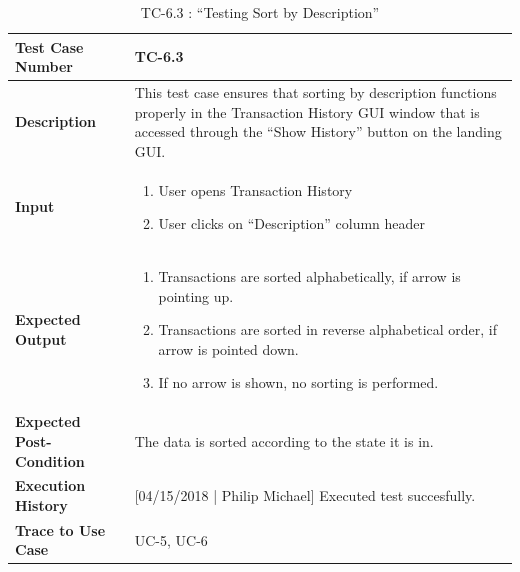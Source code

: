 \documentclass[12pt]{article}
\begin{document}
\begin{table}[H]
\caption{TC-6.3 : “Testing Sort by Description”}
\begin{center}
\begin{tabular}{|p{5.5	cm}|p{11cm}|}
  \hline
  \bf Test Case Number & TC-6.3\\\hline
  \bf Description & This test case ensures that sorting by description functions properly in the Transaction History GUI window that is accessed through the ``Show History'' button on the landing GUI.\\\hline
  \bf Input &
  \begin{enumerate}
  \item User opens Transaction History
  \item User clicks on ``Description'' column header
  \end{enumerate}
  \\\hline
  \bf Expected Output &
  \begin{enumerate}
  \item Transactions are sorted alphabetically, if arrow is pointing up.
  \item Transactions are sorted in reverse alphabetical order, if arrow is pointed down.
  \item If no arrow is shown, no sorting is performed.
  \end{enumerate}
  \\\hline
  \bf Expected Post-Condition & The data is sorted according to the state it is in.\\\hline
  \bf Execution History & [04/15/2018 | Philip Michael] Executed test succesfully.\\\hline
  \bf Trace to Use Case & UC-5, UC-6\\

  \hline
\end{tabular}
\end{center}
\end{table}
\end{document}
